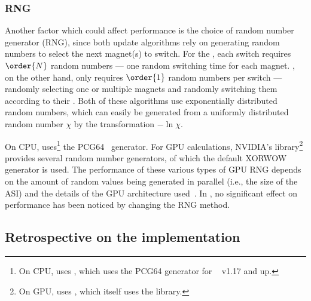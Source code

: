 \subsubsection{RNG}
Another factor which could affect performance is the choice of random number generator (RNG), since both update algorithms rely on generating random numbers to select the next magnet(s) to switch.
For the , each switch requires $\order{N}$ random numbers --- one random switching time for each magnet.
, on the other hand, only requires $\order{1}$ random numbers per switch --- randomly selecting one or multiple magnets and randomly switching them according to their .
Both of these algorithms use exponentially distributed random numbers, which can easily be generated from a uniformly distributed random number $\chi$ by the transformation $-\ln{\chi}$. \par
On CPU, \hotspice uses\footnote{
	On CPU, \hotspice uses , which uses the PCG64 generator for ~\cite{NumPy} v1.17 and up.
} the PCG64~\cite{PCG64} generator.
For GPU calculations, NVIDIA's  library\footnote{
	On GPU, \hotspice uses , which itself uses the  library.
} provides several random number generators, of which the default XORWOW~\cite{XORWOW} generator is used.
The performance of these various types of GPU RNG depends on the amount of random values being generated in parallel (i.e., the size of the ASI) and the details of the GPU architecture used~\cite{RNG_GPU_evaluation}.
In \hotspice, no significant effect on performance has been noticed by changing the RNG method.

\subsection{Retrospective on the \hotspice implementation}
